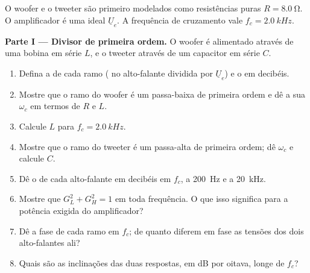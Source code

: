 \begin{problem}
\label{pb:b1:filters-transfer-functions:1}
O woofer e o tweeter são primeiro modelados como resistências puras
$R = \qty{8.0}{\ohm}$. O amplificador é uma  ideal
$\underline U_e$. A frequência de cruzamento vale $f_c = \qty{2.0}{kHz}$.

\medskip
\noindent\textbf{Parte I --- Divisor de primeira ordem.}
O woofer é alimentado através de uma bobina em série $L$, e o tweeter através de um
capacitor em série $C$.
\begin{enumerate}
  \item Defina a  de cada ramo ( no
        alto-falante dividida por $\underline U_e$) e o  em decibéis.
  \item Mostre que o ramo do woofer é um passa-baixa de primeira ordem e dê
        a sua  $\omega_c$ em termos de $R$ e $L$.
  \item Calcule $L$ para $f_c = \qty{2.0}{kHz}$.
  \item Mostre que o ramo do tweeter é um passa-alta de primeira ordem; dê
        $\omega_c$ e calcule $C$.
  \item Dê o  de cada alto-falante em decibéis em $f_c$, a \qty{200}{Hz}
        e a \qty{20}{kHz}.
  \item Mostre que $G_L^2 + G_H^2 = 1$ em toda frequência. O que isso
        significa para a potência exigida do amplificador?
  \item Dê a fase de cada ramo em $f_c$; de quanto diferem em fase as
        tensões dos dois alto-falantes ali?
  \item Quais são as inclinações das duas respostas, em dB por oitava, longe
        de $f_c$?
\end{enumerate}


\end{problem}
